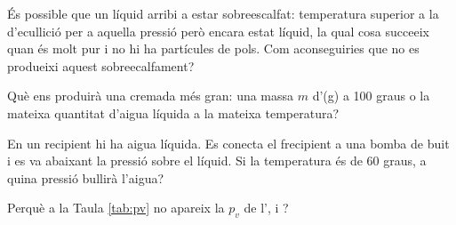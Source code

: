 \begin{exr}
És possible que un líquid arribi a estar sobreescalfat: temperatura superior a la d'ecullició per a aquella pressió però encara estat líquid, la qual cosa succeeix quan és molt pur i no hi ha partícules de pols.
Com aconseguiries que no es produeixi aquest sobreecalfament?
\end{exr} 
\begin{exr}
    Què ens produirà una cremada més gran: una massa $m$ d'(g) a 100 graus o la mateixa quantitat d'aigua líquida a la mateixa temperatura?
    \end{exr}
    
    \begin{exr}
    En un recipient hi ha aigua líquida. Es conecta el frecipient a una bomba de buit i es va abaixant la pressió sobre el líquid. Si la temperatura és de 60 graus, a quina pressió bullirà l'aigua?
    \end{exr}
    
    \begin{exr}
    Perquè a la Taula \ref{tab:pv} no apareix la $p_v$ de l',  i ?
    \end{exr}